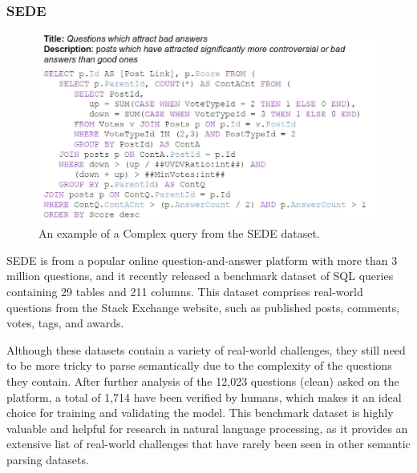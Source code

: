 \subsubsection{SEDE}

\begin{figure}[htbp]
    \centering
    \includegraphics[width=0.8\linewidth]{pics/sede_sql.jpg}
    \caption{An example of a Complex query from the SEDE dataset.\cite{DBLP:journals/corr/abs-2106-05006}}
    \label{fig:sede_sql}
\end{figure}

\ac{SEDE} \cite{DBLP:journals/corr/abs-2106-05006} is from a popular online question-and-answer platform with more than 3 million questions, and it recently released a benchmark dataset of SQL queries containing 29 tables and 211 columns. This dataset comprises real-world questions from the Stack Exchange website, such as published posts, comments, votes, tags, and awards.

Although these datasets contain a variety of real-world challenges, they still need to be more tricky to parse semantically due to the complexity of the questions they contain. After further analysis of the 12,023 questions (clean) asked on the platform, a total of 1,714 have been verified by humans, which makes it an ideal choice for training and validating the model. This benchmark dataset is highly valuable and helpful for research in natural language processing, as it provides an extensive list of real-world challenges that have rarely been seen in other semantic parsing datasets.